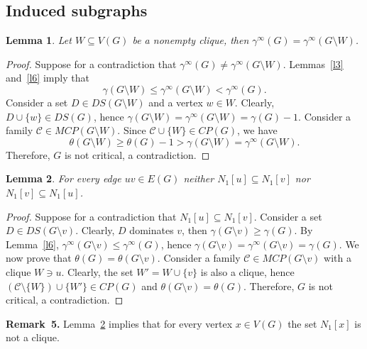 \documentclass[12pt]{article}
\newtheorem{lemma}{Lemma}
\begin{document}
\subsection{Induced subgraphs}\label{s41}



\begin{lemma}\label{l11}
Let $ W \subseteq V(G)$ be a nonempty clique, then $\gamma^{\infty}(G) = \gamma^{\infty}(G \setminus W)$.

\end{lemma}

\begin{proof}

Suppose for a contradiction that $\gamma^{\infty}(G) \neq \gamma^{\infty}(G \setminus W)$. Lemmas~\ref{l3} and~\ref{l6} imply that $$\gamma(G \setminus W) \leq \gamma^{\infty}(G \setminus W) < \gamma^{\infty}(G).$$ Consider a set $D \in DS(G \setminus W)$ and a vertex $w \in W$. Clearly, $D \cup \{w\} \in DS(G)$, hence $\gamma(G \setminus W) = \gamma^{\infty}(G \setminus W) = \gamma(G) - 1$. Consider a family $\mathcal{C} \in MCP(G \setminus W)$. Since $\mathcal{C} \cup\{W\} \in CP(G)$, we have $$\theta(G \setminus W) \geq \theta(G) - 1 > \gamma(G \setminus W) = \gamma^{\infty}(G \setminus W).$$
Therefore, $G$ is not critical, a contradiction.
\end{proof}



\begin{lemma}\label{l12}
For every edge $uv \in E(G)$ neither $N_1[u] \subseteq N_1[v]$ nor $N_1[v] \subseteq N_1[u]$. 
\end{lemma}

\begin{proof}
Suppose for a contradiction that $N_1[u] \subseteq N_1[v]$. Consider a set $D \in DS(G \setminus v)$. Clearly, $D$ dominates $v$, then $\gamma(G \setminus v) \geq \gamma(G)$. By Lemma~\ref{l6}, $\gamma^{\infty}(G \setminus v) \leq \gamma^{\infty}(G)$, hence $\gamma(G \setminus v) = \gamma^{\infty}(G \setminus v) = \gamma(G)$. We now prove that $\theta(G) = \theta(G \setminus v)$. Consider a family $\mathcal{C} \in MCP(G \setminus v)$ with a clique $W \ni u$. Clearly, the set $W' = W \cup \{v\}$ is also a clique, hence $(\mathcal{C} \setminus \{W\}) \cup \{W'\} \in CP(G)$ and $\theta(G \setminus v) = \theta(G)$. Therefore, $G$ is not critical, a contradiction.
\end{proof}

\textbf{Remark~5.} Lemma~\ref{l12} implies that for every vertex $x \in V(G)$ the set $N_1[x]$ is not a clique.
\end{document}
